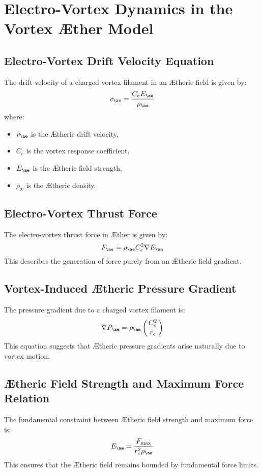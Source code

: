 \section{Electro-Vortex Dynamics in the Vortex \AE ther Model}

\subsection{Electro-Vortex Drift Velocity Equation}
The drift velocity of a charged vortex filament in an \AE theric field is given by:
\begin{equation}
    v_{\ae} = \frac{C_e E_{\ae}}{\rho_{\text{\ae}}}
\end{equation}
where:
\begin{itemize}
    \item $v_{\ae}$ is the \AE theric drift velocity,
    \item $C_e$ is the vortex response coefficient,
    \item $E_{\ae}$ is the \AE theric field strength,
    \item $\rho_{\text{\ae}}$ is the \AE theric density.
\end{itemize}

\subsection{Electro-Vortex Thrust Force}
The electro-vortex thrust force in \AE ther is given by:
\begin{equation}
    F_{\ae} = \rho_{\text{\ae}} C_e^2 \nabla E_{\ae}
\end{equation}
This describes the generation of force purely from an \AE theric field gradient.

\subsection{Vortex-Induced \AE theric Pressure Gradient}
The pressure gradient due to a charged vortex filament is:
\begin{equation}
    \nabla P_{\ae} = \rho_{\text{\ae}} \left( \frac{C_e^2}{r_c} \right)
\end{equation}
This equation suggests that \AE theric pressure gradients arise naturally due to vortex motion.

\subsection{\AE theric Field Strength and Maximum Force Relation}
The fundamental constraint between \AE theric field strength and maximum force is:
\begin{equation}
    E_{\ae} = \frac{F_{\max}}{r_c^2 \rho_{\text{\ae}}}
\end{equation}
This ensures that the \AE theric field remains bounded by fundamental force limits.

